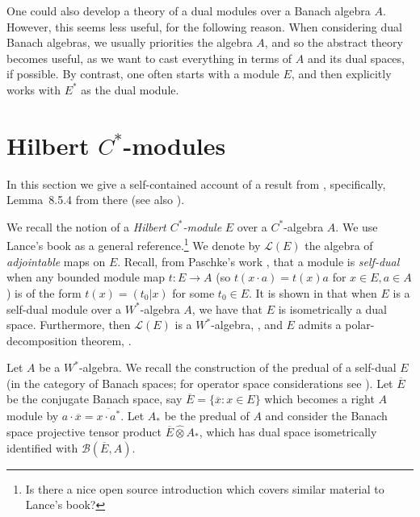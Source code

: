 \documentclass[a4paper,11pt]{article}
\theoremstyle{plain}
\theoremstyle{remark}
\newcommand{\mc}[1]{\mathcal{#1}}
\newcommand{\proten}{\widehat\otimes}
\begin{document}
One could also develop a theory of a dual modules over a Banach algebra $A$.  However, this seems less useful, for the following reason.  When considering dual Banach algebras, we usually priorities the algebra $A$, and so the abstract theory becomes useful, as we want to cast everything in terms of $A$ and its dual spaces, if possible.  By contrast, one often starts with a module $E$, and then explicitly works with $E^*$ as the dual module.




\clearpage
\section{Hilbert \texorpdfstring{$C^*$}{CStar}-modules}

In this section we give a self-contained account of a result from \cite[Section~8.5.1]{BlecherLeMerdy_Book}, specifically, Lemma~8.5.4 from there (see also \cite[Lemma~2.5]{Schweizer_HilbModsPredual}).

We recall the notion of a \emph{Hilbert $C^*$-module} $E$ over a $C^*$-algebra $A$.  We use Lance's book \cite{Lance_HilbModsBook} as a general reference.\footnote{Is there a nice open source introduction which covers similar material to Lance's book?}
We denote by $\mc L(E)$ the algebra of \emph{adjointable} maps on $E$.  Recall, from Paschke's work \cite{paschke_inner_prod_mods}, that a module is \emph{self-dual} when any bounded module map $t \colon E \to A$ (so $t(x\cdot a) = t(x)a$ for $x\in E, a\in A$) is of the form $t(x) = (t_0|x)$ for some $t_0\in E$.  It is shown in \cite[Proposition~3.8]{paschke_inner_prod_mods} that when $E$ is a self-dual module over a $W^*$-algebra $A$, we have that $E$ is isometrically a dual space.  Furthermore, then $\mc L(E)$ is a $W^*$-algebra, \cite[Proposition~3.10]{paschke_inner_prod_mods}, and $E$ admits a polar-decomposition theorem, \cite[Proposition~3.11]{paschke_inner_prod_mods}.

Let $A$ be a $W^*$-algebra.  We recall the construction of the predual of a self-dual $E$ (in the category of Banach spaces; for operator space considerations see \cite{BlecherLeMerdy_Book}).  Let $\overline{E}$ be the conjugate Banach space, say $\overline E = \{ \overline x : x\in E \}$ which becomes a right $A$ module by $a \cdot \overline{x} = \overline{x\cdot a^*}$.  Let $A_*$ be the predual of $A$ and consider the Banach space projective tensor product $\overline{E} \proten A_*$, which has dual space isometrically identified with $\mc B(\overline E, A)$.
\end{document}
